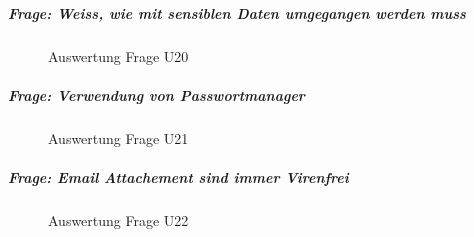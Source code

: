 \documentclass[../../main.tex]{subfiles}
\begin{document}
\subparagraph*{Frage: Weiss, wie mit sensiblen Daten umgegangen werden muss}\mbox{}
\begin{figure}[H]
\centering
{}
\caption{Auswertung Frage U20}
\label{U20}
\end{figure}

\subparagraph*{Frage: Verwendung von Passwortmanager}\mbox{}
\begin{figure}[H]
\centering
{}
\caption{Auswertung Frage U21}
\label{U21}
\end{figure}

\subparagraph*{Frage: Email Attachement sind immer Virenfrei}\mbox{}
\begin{figure}[H]
\centering
{}
\caption{Auswertung Frage U22}
\label{U22}
\end{figure}
\end{document}
